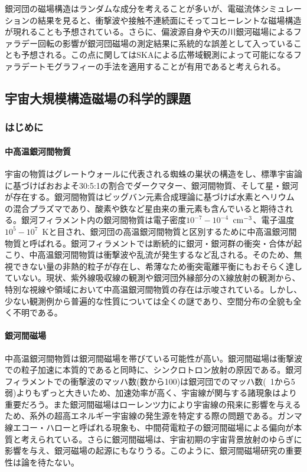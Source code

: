 銀河団の磁場構造はランダムな成分を考えることが多いが、電磁流体シミュレーションの結果を見ると、衝撃波や接触不連続面にそってコヒーレントな磁場構造が現れることも予想されている\citep{2008ApJ...687..951T,2011ApJ...743...16Z}。さらに、偏波源自身や天の川銀河磁場によるファラデー回転の影響が銀河団磁場の測定結果に系統的な誤差として入っていることも予想される。この点に関してはSKAによる広帯域観測によって可能になるファラデートモグラフィーの手法を適用することが有用であると考えられる。


\subsection{宇宙大規模構造磁場の科学的課題}
\label{c06.s1.ss6}

\subsubsection{はじめに}
\label{c06.s1.ss6.sss1}

\paragraph{中高温銀河間物質}

宇宙の物質はグレートウォールに代表される蜘蛛の巣状の構造をし、標準宇宙論に基づけばおおよそ30:5:1の割合でダークマター、銀河間物質、そして星・銀河が存在する。銀河間物質はビッグバン元素合成理論に基づけば水素とヘリウムの混合プラズマであり、酸素や鉄など星由来の重元素も含んでいると期待される。銀河フィラメント内の銀河間物質は電子密度$10^{-7}-10^{-4}$~${\rm cm^{-3}}$、電子温度$10^{5}-10^{7}$~Kと目され、銀河団の高温銀河間物質と区別するために中高温銀河間物質と呼ばれる\citep{1999ApJ...514....1C, 2003PASJ...55..879Y}。銀河フィラメントでは断続的に銀河・銀河群の衝突・合体が起こり、中高温銀河間物質は衝撃波や乱流が発生するなど乱される。そのため、無視できない量の非熱的粒子が存在し、希薄なため衝突電離平衡にもおそらく達していない。現状、紫外線吸収線の観測や銀河団外縁部分のX線放射の観測から、特別な視線や領域において中高温銀河間物質の存在は示唆されている。しかし、少ない観測例から普遍的な性質については全くの謎であり、空間分布の全貌も全く不明である。

\paragraph{銀河間磁場}

中高温銀河間物質は銀河間磁場を帯びている可能性が高い\citep{2012SSRv..166....1R, 2012SSRv..166...37W}。銀河間磁場は衝撃波での粒子加速に本質的であると同時に、シンクロトロン放射の原因である。銀河フィラメントでの衝撃波のマッハ数(数から100)は銀河団でのマッハ数(~1から5弱)よりもずっと大きいため\citep{2003ApJ...593..599R}、加速効率が高く、宇宙線が関与する諸現象はより重要だろう。また銀河間磁場はローレンツ力により宇宙線の飛来に影響を与えるため、系外の超高エネルギー宇宙線の発生源を特定する際の問題である。ガンマ線エコー・ハローと呼ばれる現象も、中間荷電粒子の銀河間磁場による偏向が本質と考えられている。さらに銀河間磁場は、宇宙初期の宇宙背景放射のゆらぎに影響を与え、銀河磁場の起源にもなりうる。このように、銀河間磁場研究の重要性は論を待たない。


